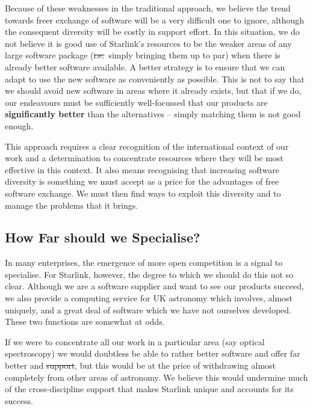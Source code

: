 Because of these weaknesses in the traditional approach, we believe
the trend towards freer exchange of software will be a very difficult
one to ignore, although the consequent diversity will be costly in
support effort.  In this situation, we do not believe it is good use of
Starlink's resources to be \st{} the weaker areas of any
large software package (\st{i.e.}\ simply bringing them up to par)
when there is already better software available. A better strategy is
to ensure that we can adapt to use the new software as conveniently as
possible. This is not to say that we should avoid \st{} new
software in areas where it already exists, but that if we do, our
endeavours must be sufficiently well-focussed that our products are
{\bf significantly better} than the alternatives -- simply matching
them is not good enough.

This approach requires a clear recognition of the international
context of our work and a determination to concentrate resources where
they will be most effective in this context. It also means recognising
that increasing software diversity is something we must accept as a
price for the advantages of free software exchange. We must then find
ways to exploit this diversity and to manage the problems that it
brings.

\subsection{How Far should we Specialise?}

In many enterprises, the emergence of more open competition is a
signal to specialise. For Starlink, however, the degree to which we
should do this not so clear. Although we are a software supplier and
want to see our products succeed, we also provide a computing service
for UK astronomy which involves, almost uniquely,
\st{} and \st{} a great deal of
software which we have not ourselves developed. These two functions
are somewhat at odds.

If we were to concentrate all our work in a particular area (say
optical spectroscopy) we would doubtless be able to \st{}
rather better software and offer far better \st{} and
\st{support}, but this would be at the price of withdrawing almost
completely from other areas of astronomy.  We believe this would
undermine much of the cross-discipline support that makes Starlink
unique and accounts for its success.

